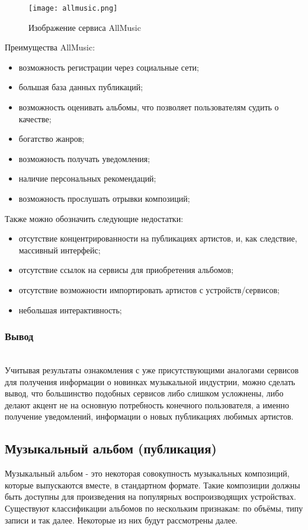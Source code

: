 \begin{figure}[ht]
\centering
  \texttt{[image: allmusic.png]}
  \caption{ Изображение сервиса AllMusic }
  \label{fig:domain:allmusic:picture}
\end{figure}

Преимущества AllMusic:

\begin{itemize}
  \item возможность регистрации через социальные сети;
  \item большая база данных публикаций;
  \item возможность оценивать альбомы, что позволяет пользователям судить о качестве;
  \item богатство жанров;
  \item возможность получать уведомления;
  \item наличие персональных рекомендаций;
  \item возможность прослушать отрывки композиций;
\end{itemize}

Также можно обозначить следующие недостатки:

\begin{itemize}
  \item отсутствие концентрированности на публикациях артистов, и, как следствие, массивный интерфейс;
  \item отсутствие ссылок на сервисы для приобретения альбомов;
  \item отсутствие возможности импортировать артистов с устройств/сервисов;
  \item небольшая интерактивность;
\end{itemize}

\subsubsection{Вывод}
\label{sub:domain:analogues_review:conclusion}
~\\

Учитывая результаты ознакомления с уже присутствующими аналогами сервисов для получения информации о новинках музыкальной индустрии, можно сделать вывод, что большинство подобных сервисов либо слишком усложнены, либо делают акцент не на основную потребность конечного пользователя, а именно получение уведомлений, информации о новых публикациях любимых артистов.

\subsection{Музыкальный альбом (публикация)}
\label{sub:domain:music_album}
Музыкальный альбом - это некоторая совокупность музыкальных композиций, которые выпускаются вместе, в стандартном формате. Такие композиции должны быть доступны для произведения на популярных воспроизводящих устройствах.
Существуют классификации альбомов по нескольким признакам: по объёмы, типу записи и так далее. Некоторые из них будут рассмотрены далее.

